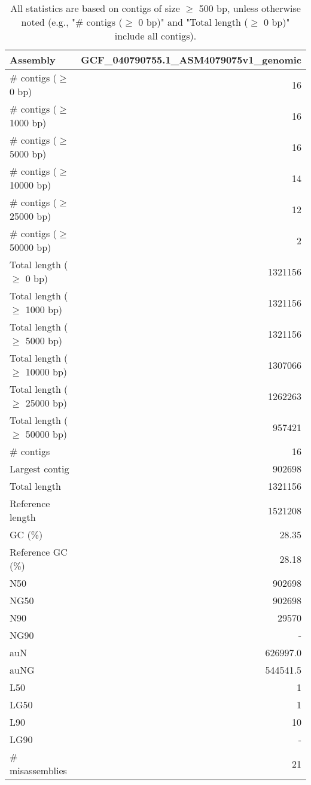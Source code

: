 \documentclass[12pt,a4paper]{article}
\begin{document}
\begin{table}[ht]
\begin{center}
\caption{All statistics are based on contigs of size $\geq$ 500 bp, unless otherwise noted (e.g., "\# contigs ($\geq$ 0 bp)" and "Total length ($\geq$ 0 bp)" include all contigs).}
\begin{tabular}{|l*{1}{|r}|}
\hline
Assembly & GCF\_040790755.1\_ASM4079075v1\_genomic \\ \hline
\# contigs ($\geq$ 0 bp) & 16 \\ \hline
\# contigs ($\geq$ 1000 bp) & 16 \\ \hline
\# contigs ($\geq$ 5000 bp) & 16 \\ \hline
\# contigs ($\geq$ 10000 bp) & 14 \\ \hline
\# contigs ($\geq$ 25000 bp) & 12 \\ \hline
\# contigs ($\geq$ 50000 bp) & 2 \\ \hline
Total length ($\geq$ 0 bp) & 1321156 \\ \hline
Total length ($\geq$ 1000 bp) & 1321156 \\ \hline
Total length ($\geq$ 5000 bp) & 1321156 \\ \hline
Total length ($\geq$ 10000 bp) & 1307066 \\ \hline
Total length ($\geq$ 25000 bp) & 1262263 \\ \hline
Total length ($\geq$ 50000 bp) & 957421 \\ \hline
\# contigs & 16 \\ \hline
Largest contig & 902698 \\ \hline
Total length & 1321156 \\ \hline
Reference length & 1521208 \\ \hline
GC (\%) & 28.35 \\ \hline
Reference GC (\%) & 28.18 \\ \hline
N50 & 902698 \\ \hline
NG50 & 902698 \\ \hline
N90 & 29570 \\ \hline
NG90 & - \\ \hline
auN & 626997.0 \\ \hline
auNG & 544541.5 \\ \hline
L50 & 1 \\ \hline
LG50 & 1 \\ \hline
L90 & 10 \\ \hline
LG90 & - \\ \hline
\# misassemblies & 21 \\ \hline

\end{tabular}
\end{center}
\end{table}
\end{document}
